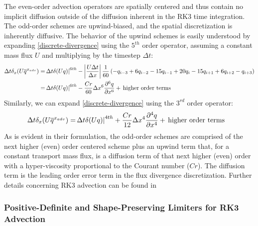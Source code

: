 The even-order advection operators are spatially centered and thus
contain no implicit diffusion outside of the diffusion inherent in
the RK3 time integration.  The odd-order schemes are upwind-biased, and
the spatial discretization is inherently diffusive.  The behavior of 
the upwind schemes is easily understood by expanding
\eqref{discrete-divergence} using the $5^{th}$ order operator, assuming a
constant mass flux $U$ and
multiplying by the timestep $\Delta t$:
%
\begin{align}
\Delta t \delta_x (U \overline{q}^{x_{adv}}) =  
& \, {\Delta t} {\delta (Uq)|}^{6th}
-\left| {U \Delta t \over \Delta x }\right| {1 \over 60}
\left(-q_{i-3}+6q_{i-2}-15q_{i-1}+20q_{i}-15q_{i+1}+6q_{i+2}-q_{i+3}
\right)
\notag
\\
= & \, {\Delta t} {\delta (Uq)|}^{6th} - {Cr \over 60} \Delta x^6 {\partial^6
q \over \partial x^6} + \, {\rm higher\ order\ terms}
\notag
\end{align}
%
\noindent
Similarly, we can expand \eqref{discrete-divergence} using the $3^{rd}$
order operator:
\begin{align}
\Delta t \delta_x (U \overline{q}^{x_{adv}})
= & \, {\Delta t} {\delta (Uq)|}^{4th} + {Cr \over 12} \Delta x^4 {\partial^4
q \over \partial x^4} + \, {\rm higher\ order\ terms}
\notag
\end{align}
%
\noindent
As is evident in
their formulation, the odd-order schemes are comprised of the next
higher (even) order centered scheme plus an upwind term that, for a
constant transport mass flux, is a diffusion term of that next higher
(even) order with a hyper-viscosity proportional to the Courant number
($Cr$).
The diffusion term is the leading order error term in the flux
divergence discretization.
Further details concerning RK3 advection can be found in \citet{wicker02}

\subsubsection{Positive-Definite and Shape-Preserving Limiters for RK3 Advection}
\label{positive-definite-transport}

